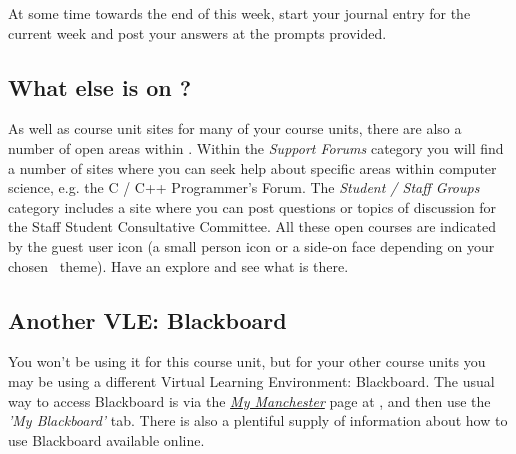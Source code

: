 At some time towards the end of this week, start your journal entry for the current week and post your answers at the prompts provided.

\subsection{What else is on \moodle?}
\label{sec:what-else-moodle}


As well as course unit sites for many of your course units, there are also a number of open areas within \moodle. Within the \emph{Support Forums} category you will find a number of sites where you can seek help about specific areas within computer science, e.g. the C / C++ Programmer's Forum. The \emph{Student / Staff Groups} category includes a site where you can post questions or topics of discussion for the Staff Student Consultative Committee. All these open courses are indicated by the guest user icon (a small person icon or a side-on face depending on your chosen \moodle\ theme). Have an explore and see what is there.









\subsection{Another VLE: Blackboard}
\label{sec:blackboard}

You won't be using it for this course unit, but for your other course units you may be using a different Virtual Learning Environment: \textsf{Blackboard}. The usual way to access \textsf{Blackboard} is via the \href{https://my.manchester.ac.uk}{\emph{My Manchester}} page at , and then use the \emph{'My Blackboard'} tab. There is also a plentiful supply of information about how to use Blackboard available online. 

